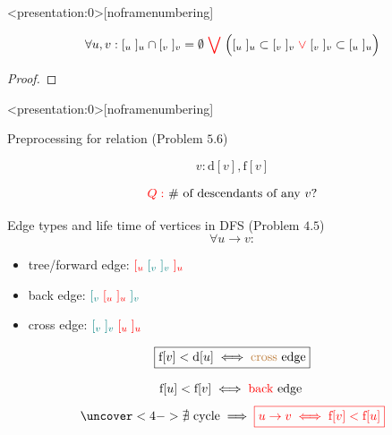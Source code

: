 \begin{frame}<presentation:0>[noframenumbering]
  \begin{theorem}
    \[
	  \forall u,v: [_{u} \; ]_{u} \cap [_{v} \; ]_{v} = \emptyset \;\textcolor{red}{\bigvee}\;
	  \Big([_{u} \; ]_{u} \subset [_{v} \; ]_{v} \;\textcolor{red}{\lor}\; [_{v} \; ]_{v} \subset [_{u} \; ]_{u}\Big)
    \]
  \end{theorem}

  \pause
  \begin{proof}
  \end{proof}
\end{frame}

\begin{frame}<presentation:0>[noframenumbering]
  \begin{exampleblock}{Preprocessing for  relation (Problem $5.6$)}

    \centerline{}
  \end{exampleblock}

  \pause
  \[
    v: \text{d}[v], \text{f}[v]
  \]

  \pause
  \vspace{-0.20cm}
  \[
    \textcolor{red}{Q: } \text{ \# of descendants of any } v?
  \]
\end{frame}

\begin{frame}{}
  \begin{exampleblock}{Edge types and life time of vertices in DFS (Problem $4.5$)}
    \[
      \forall u \to v:
    \]
    \vspace{-0.30cm}
    \begin{itemize}
      \setlength{\itemsep}{5pt}
      \item tree/forward edge: $\textcolor{red}{[_{u}}\; \textcolor{teal}{[_{v}\; ]_{v}}\; \textcolor{red}{]_{u}}$
      \item back edge: $\textcolor{teal}{[_{v}}\; \textcolor{red}{[_{u}\; ]_{u}}\; \textcolor{teal}{]_{v}}$
      \item cross edge: $\textcolor{teal}{[_{v}\; ]_{v}}\; \textcolor{red}{[_{u}\; ]_{u}}$
    \end{itemize}
  \end{exampleblock}

  \pause
  \[
	\boxed{\text{f}[v] < \text{d}[u] \iff \text{\textcolor{brown}{cross} edge}}
  \]

  \pause
  \[
    \text{f}[u] < \text{f}[v] \iff \text{\textcolor{red}{back} edge }
  \]
  \[
    \uncover<4->{\nexists \text{ cycle} \implies \red{\boxed{u \to v \iff \text{f}[v] < \text{f}[u]}}}
  \]
\end{frame}

